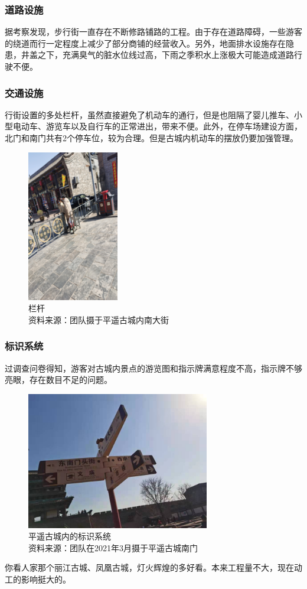 \documentclass[UTF8]{ctexart}
\begin{document}
        \subsubsection{道路设施}
        据考察发现，步行街一直存在不断修路铺路的工程。由于存在道路障碍，一些游客的绕道而行一定程度上减少了部分商铺的经营收入。另外，地面排水设施存在隐患，井盖之下，充满臭气的脏水位线过高，下雨之季积水上涨极大可能造成道路行驶不便。
        \subsubsection{交通设施}
        行街设置的多处栏杆，虽然直接避免了机动车的通行，但是也阻隔了婴儿推车、小型电动车、游览车以及自行车的正常进出，带来不便。此外，在停车场建设方面，北门和南门共有2个停车位，较为合理。但是古城内机动车的摆放仍要加强管理。
        \begin{figure}[H]
            \centering
            \includegraphics[width=4cm]{图片 10.png}
            \caption[plain]{栏杆\\资料来源：团队摄于平遥古城内南大街}
            \label{fig:my_label}
        \end{figure}
        \subsubsection{标识系统}
        过调查问卷得知，游客对古城内景点的游览图和指示牌满意程度不高，指示牌不够亮眼，存在数目不足的问题。
        \begin{figure}[H]
            \centering
            \includegraphics[width=8cm]{标识.jpg}
            \caption[plain]{平遥古城内的标识系统\\资料来源：团队在2021年3月摄于平遥古城南门}
            \label{fig:my_label}
        \end{figure}
        你看人家那个丽江古城、凤凰古城，灯火辉煌的多好看。本来工程量不大，现在动工的影响挺大的。
        
\end{document}
